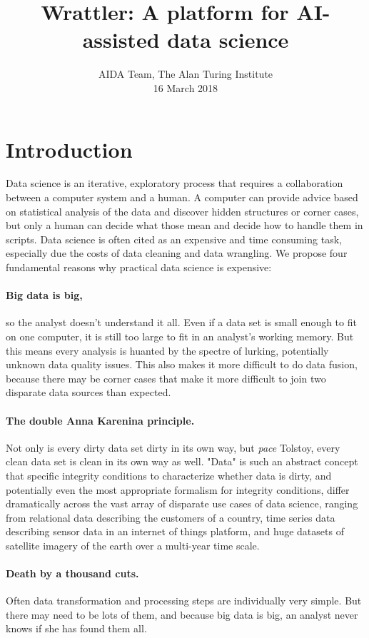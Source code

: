 \documentclass[sigplan,preprint,10pt]{acmart}\settopmatter{printfolios=true,printccs=false,printacmref=false}
\title{Wrattler: \textnormal{A platform for AI-assisted data science}}
\author{AIDA Team, The Alan Turing Institute \\ 16 March 2018}
\begin{document}
\maketitle

\section{Introduction}
Data science is an iterative, exploratory process that requires a collaboration between a
computer system and a human. A computer can provide advice based on statistical analysis of the
data and discover hidden structures or corner cases, but only a human can decide what those mean
and decide how to handle them in scripts. Data science is often cited as an expensive
and time consuming task, especially due the costs of data cleaning and data wrangling.
We propose four fundamental reasons why
practical data science is expensive:

\paragraph{Big data is big,}
so the analyst doesn't understand it all.
Even if a data set is small enough to fit on one computer, it is still too large to fit in
an analyst's working memory.
But this means every analysis is huanted
by the spectre of lurking, potentially
unknown data quality  issues.
This also makes it more difficult to do data fusion, because there may be corner cases that make it more difficult to join two disparate data sources than expected.

\paragraph{The double Anna Karenina principle.}
Not only is every dirty data set  dirty in its own way, but \emph{pace} Tolstoy, every clean data set is clean in its own way as well.
"Data" is such an abstract concept that specific integrity conditions to characterize whether data is dirty, and potentially even the most appropriate formalism for integrity conditions,  differ dramatically across
the vast array of disparate use cases of data science,
ranging from relational data describing the customers of a country, time series data describing sensor data in an internet of things platform, and huge datasets of satellite imagery of the earth over a multi-year time scale.

\paragraph{Death by a thousand cuts.}
Often data transformation and processing steps are individually  very simple. But  there may need to be lots of them, and
because big data is big,
an analyst never knows if she has found them all.
\end{document}
